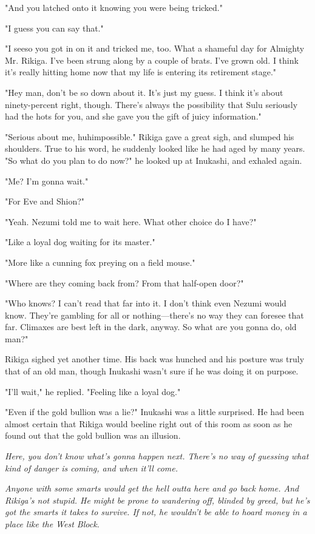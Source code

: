 "And you latched onto it knowing you were being tricked."

"I guess you can say that."

"I see\el so you got in on it and tricked me, too. What a shameful day
for Almighty Mr. Rikiga. I've been strung along by a couple of brats.
I've grown old. I think it's really hitting home now that my life is
entering its retirement stage."

"Hey man, don't be so down about it. It's just my guess. I think it's
about ninety-percent right, though. There's always the possibility that
Sulu seriously had the hots for you, and she gave you the gift of juicy
information."

"Serious about me, huh\el impossible." Rikiga gave a great sigh, and
slumped his shoulders. True to his word, he suddenly looked like he had
aged by many years. "So what do you plan to do now?" he looked up at
Inukashi, and exhaled again.

"Me? I'm gonna wait."

"For Eve and Shion?"

"Yeah. Nezumi told me to wait here. What other choice do I have?"

"Like a loyal dog waiting for its master."

"More like a cunning fox preying on a field mouse."

"Where are they coming back from? From that half-open door?"

"Who knows? I can't read that far into it. I don't think even Nezumi
would know. They're gambling for all or nothing---there's no way they can
foresee that far. Climaxes are best left in the dark, anyway. So what
are you gonna do, old man?"

Rikiga sighed yet another time. His back was hunched and his posture was
truly that of an old man, though Inukashi wasn't sure if he was doing it
on purpose.

"I'll wait," he replied. "Feeling like a loyal dog."

"Even if the gold bullion was a lie?" Inukashi was a little surprised.
He had been almost certain that Rikiga would beeline right out of this
room as soon as he found out that the gold bullion was an illusion.

\emph{Here, you don't know what's gonna happen next. There's no way of
guessing what kind of danger is coming, and when it'll come.}

\emph{Anyone with some smarts would get the hell outta here and go back home.
And Rikiga's not stupid. He might be prone to wandering off, blinded by
greed, but he's got the smarts it takes to survive. If not, he wouldn't
be able to hoard money in a place like the West Block.}

